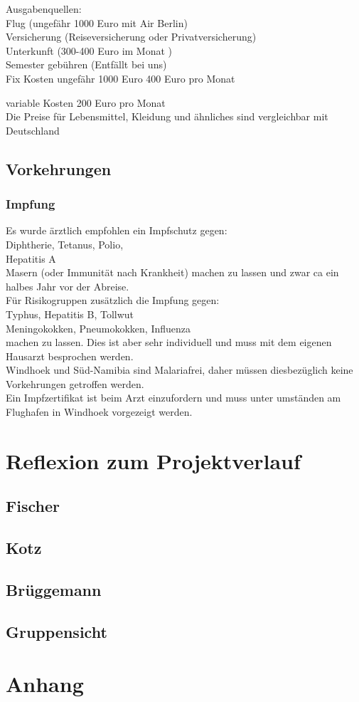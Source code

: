 \documentclass[11pt]{article}
\begin{document}
Ausgabenquellen:\\
Flug (ungefähr 1000 Euro mit Air Berlin)\\
Versicherung (Reiseversicherung oder Privatversicherung)\\
Unterkunft (300-400 Euro im Monat )\\
Semester gebühren (Entfällt bei uns)\\

Fix Kosten 		ungefähr 1000 Euro
			400 Euro pro Monat

variable Kosten 	200 Euro pro Monat\\

Die Preise für Lebensmittel, Kleidung und ähnliches sind vergleichbar mit Deutschland

\subsection{Vorkehrungen}
\subsubsection{Impfung}
Es wurde ärztlich empfohlen ein Impfschutz gegen:
\\Diphtherie, Tetanus, Polio,
\\Hepatitis A
\\Masern (oder Immunität nach Krankheit)
machen zu lassen und zwar ca ein halbes Jahr vor der 
Abreise. \\
Für Risikogruppen zusätzlich die Impfung gegen:
\\Typhus, Hepatitis B, Tollwut
\\Meningokokken, Pneumokokken, Influenza
\\machen zu lassen. Dies ist aber sehr individuell und muss mit dem eigenen Hausarzt besprochen werden.
\\
Windhoek und Süd-Namibia sind Malariafrei, daher müssen diesbezüglich keine Vorkehrungen getroffen werden. 
\\
Ein Impfzertifikat ist beim Arzt einzufordern und muss unter umständen am Flughafen in Windhoek vorgezeigt werden.



\section{Reflexion zum Projektverlauf}
\subsection{Fischer}
\subsection{Kotz}
\subsection{Brüggemann}
\subsection{Gruppensicht}
\section{Anhang}
\end{document}

